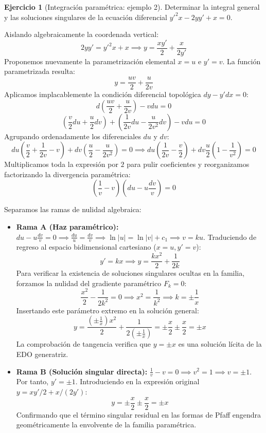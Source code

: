 \documentclass[11pt,a4paper]{article}
\theoremstyle{definition}
\newtheorem{exercise}{Ejercicio}[section]
\theoremstyle{plain}
\begin{document}
\begin{exercise}[Integración paramétrica: ejemplo 2]
Determinar la integral general y las soluciones singulares de la ecuación diferencial $y'^2 x - 2yy' + x = 0$.
\end{exercise}

\begin{tcolorbox}
Aislando algebraicamente la coordenada vertical:
$$ 2yy' = y'^2 x + x \implies y = \frac{xy'}{2} + \frac{x}{2y'} $$
Proponemos nuevamente la parametrización elemental $x=u$ e $y'=v$. La función parametrizada resulta:
$$ y = \frac{uv}{2} + \frac{u}{2v} $$
Aplicamos implacablemente la condición diferencial topológica $dy - y'dx = 0$:
$$ d\left( \frac{uv}{2} + \frac{u}{2v} \right) - v du = 0 $$
$$ \left( \frac{v}{2}du + \frac{u}{2}dv \right) + \left( \frac{1}{2v}du - \frac{u}{2v^2}dv \right) - v du = 0 $$
Agrupando ordenadamente los diferenciales $du$ y $dv$:
$$ du\left( \frac{v}{2} + \frac{1}{2v} - v \right) + dv\left( \frac{u}{2} - \frac{u}{2v^2} \right) = 0 \implies du\left( \frac{1}{2v} - \frac{v}{2} \right) + dv \frac{u}{2}\left( 1 - \frac{1}{v^2} \right) = 0 $$
Multiplicamos toda la expresión por $2$ para pulir coeficientes y reorganizamos factorizando la divergencia paramétrica:
$$ \left( \frac{1}{v} - v \right) \left( du - u\frac{dv}{v} \right) = 0 $$

Separamos las ramas de nulidad algebraica:
\begin{itemize}
    \item \textbf{Rama A (Haz paramétrico):} $du - u\frac{dv}{v} = 0 \implies \frac{du}{u} = \frac{dv}{v} \implies \ln|u| = \ln|v| + c_1 \implies v = ku$.
    Traduciendo de regreso al espacio bidimensional cartesiano ($x=u, y'=v$):
    $$ y' = kx \implies y = \frac{kx^2}{2} + \frac{1}{2k} $$
    Para verificar la existencia de soluciones singulares ocultas en la familia, forzamos la nulidad del gradiente paramétrico $F_k = 0$:
    $$ \frac{x^2}{2} - \frac{1}{2k^2} = 0 \implies x^2 = \frac{1}{k^2} \implies k = \pm \frac{1}{x} $$
    Insertando este parámetro extremo en la solución general:
    $$ y = \frac{\left(\pm \frac{1}{x}\right)x^2}{2} + \frac{1}{2\left(\pm \frac{1}{x}\right)} = \pm \frac{x}{2} \pm \frac{x}{2} = \pm x $$
    La comprobación de tangencia verifica que $y = \pm x$ es una solución lícita de la EDO generatriz.

    \item \textbf{Rama B (Solución singular directa):} $\frac{1}{v} - v = 0 \implies v^2 = 1 \implies v = \pm 1$.
    Por tanto, $y' = \pm 1$. Introduciendo en la expresión original $y = xy'/2 + x/(2y')$:
    $$ y = \pm \frac{x}{2} \pm \frac{x}{2} = \pm x $$
    Confirmando que el término singular residual en las formas de Pfaff engendra geométricamente la envolvente de la familia paramétrica.
\end{itemize}


\end{tcolorbox}
\end{document}
